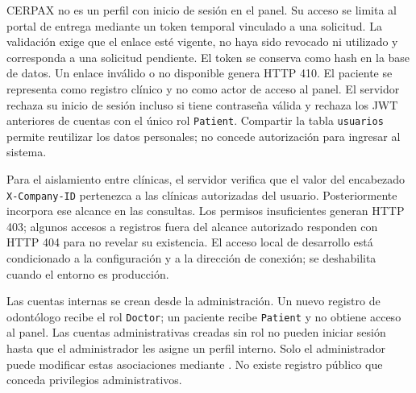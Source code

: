 CERPAX no es un perfil con inicio de sesión en el panel. Su acceso se limita
al portal de entrega mediante un token temporal vinculado a una solicitud.
La validación exige que el enlace esté vigente, no haya sido revocado ni
utilizado y corresponda a una solicitud pendiente. El token se conserva
como hash en la base de datos. Un enlace inválido o no disponible genera
HTTP 410. El paciente se representa como registro clínico y no como actor
de acceso al panel. El servidor rechaza su inicio de sesión incluso si tiene
contraseña válida y rechaza los JWT anteriores de cuentas con el único rol
\texttt{Patient}. Compartir la tabla \texttt{usuarios} permite reutilizar los
datos personales; no concede autorización para ingresar al sistema.

Para el aislamiento entre clínicas, el servidor verifica que el valor del
encabezado \texttt{X-Company-ID} pertenezca a las clínicas autorizadas del
usuario. Posteriormente incorpora ese alcance en las consultas. Los
permisos insuficientes generan HTTP 403; algunos accesos a registros fuera
del alcance autorizado responden con HTTP 404 para no revelar su existencia.
El acceso local de desarrollo está condicionado a la configuración y a
la dirección de conexión; se deshabilita cuando el entorno es producción.

Las cuentas internas se crean desde la administración. Un nuevo registro
de odontólogo recibe el rol \texttt{Doctor}; un paciente recibe
\texttt{Patient} y no obtiene acceso al panel. Las cuentas administrativas
creadas sin rol no pueden iniciar sesión hasta que el administrador les asigne
un perfil interno. Solo el administrador puede modificar estas asociaciones
mediante . No existe registro público que
conceda privilegios administrativos.

